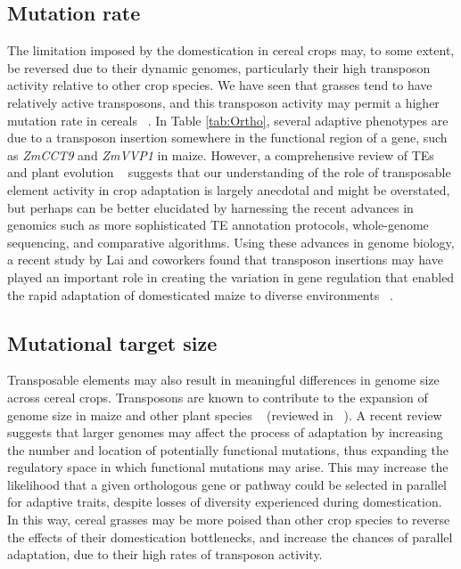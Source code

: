 \documentclass[12pt]{article}
\begin{document}
\subsection*{Mutation rate}
The limitation imposed by the domestication in cereal crops may, to some extent, be reversed due to their dynamic genomes, particularly their high transposon activity relative to other crop species. 
We have seen that grasses tend to have relatively active transposons, and this transposon activity may permit a higher mutation rate in cereals ~\citep{Wicker2016}. 
In Table \ref{tab:Ortho}, several adaptive phenotypes are due to a transposon insertion somewhere in the functional region of a gene, such as \textit{ZmCCT9} and \textit{ZmVVP1} in maize.
However, a comprehensive review of TEs and plant evolution ~\citep{Lisch2013} suggests that our understanding of the role of transposable element activity in crop adaptation is largely anecdotal and might be overstated, but perhaps can be better elucidated by harnessing the recent advances in genomics such as more sophisticated TE annotation protocols, whole-genome sequencing, and comparative algorithms.
Using these advances in genome biology, a recent study by Lai and coworkers found that transposon insertions may have played an important role in creating the variation in gene regulation that enabled the rapid adaptation of domesticated maize to diverse environments ~\citep{Lai2017}.

\subsection*{Mutational target size}
Transposable elements may also result in meaningful differences in genome size across cereal crops.
Transposons are known to contribute to the expansion of genome size in maize and other plant species ~\citep{Tenaillon2011} (reviewed in ~\citep{Lisch2013}).
A recent review ~\citep{Mei2018} suggests that larger genomes may affect the process of adaptation by increasing the number and location of potentially functional mutations, thus expanding the regulatory space in which functional mutations may arise.
This may increase the likelihood that a given orthologous gene or pathway could be selected in parallel for adaptive traits, despite losses of diversity experienced during domestication.
In this way, cereal grasses may be more poised than other crop species to reverse the effects of their domestication bottlenecks, and increase the chances of parallel adaptation, due to their high rates of transposon activity. 
\end{document}
